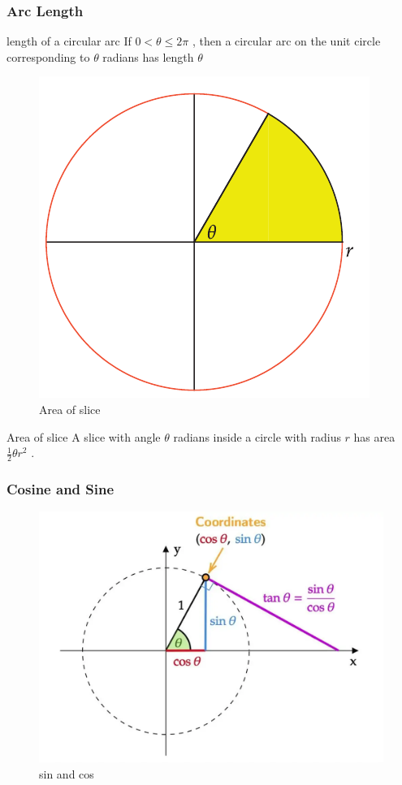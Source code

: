 \documentclass{beamer}
\begin{document}
\begin{frame}
    \frametitle{Arc Length}
    \begin{block}{length of a circular arc}
        If $0 < \theta \leq 2\pi$ , then a circular arc on the unit circle corresponding to $\theta$ radians
        has length $\theta$         
    \end{block}
\end{frame}

\begin{frame}
        \begin{figure}[h]    
            \begin{minipage}[b]{0.3\textwidth}
            \centering
            \includegraphics[scale=0.25]{7.png}
            \caption{Area of slice}
        \end{minipage}
    \end{figure}
    \begin{block}{Area of slice}
        A slice with angle $\theta$ radians inside a circle with radius $r$ has area $\frac{1}{2} \theta r^{2}$ .
    \end{block}
\end{frame}

\begin{frame}
    \frametitle{Cosine and Sine}
    \begin{figure}[h]    
        \begin{minipage}[b]{0.8\textwidth}
        \centering
        \includegraphics[scale=0.22]{8.png}
        \caption{sin and cos}
    \end{minipage}
\end{figure}
\end{frame}
\end{document}
